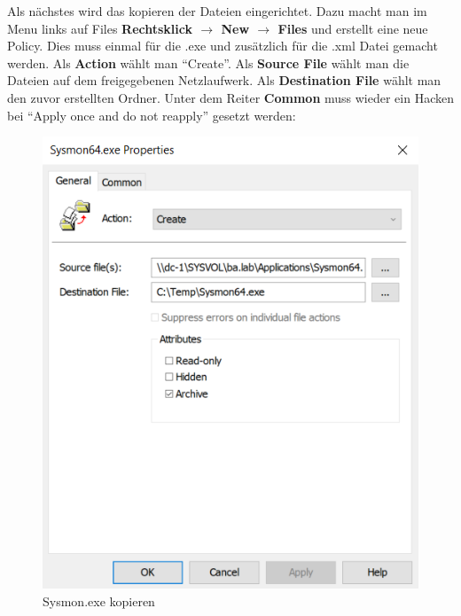 Als nächstes wird das kopieren der Dateien eingerichtet.
Dazu macht man im Menu links auf Files \textbf{Rechtsklick $\rightarrow$ New $\rightarrow$ Files} und erstellt eine neue Policy.
Dies muss einmal für die .exe und zusätzlich für die .xml Datei gemacht werden.
Als \textbf{Action} wählt man ``Create''.
Als \textbf{Source File} wählt man die Dateien auf dem freigegebenen Netzlaufwerk.
Als \textbf{Destination File} wählt man den zuvor erstellten Ordner.
Unter dem Reiter \textbf{Common} muss wieder ein Hacken bei ``Apply once and do not reapply'' gesetzt werden:\\
\begin{minipage}{0.5\linewidth}
    \begin{figure}[H]
        \centering
        \includegraphics[width=0.7\linewidth]{../img/sysmon/sysmon-file.png}
        \caption{Sysmon.exe kopieren}
    \end{figure}

\end{minipage}

